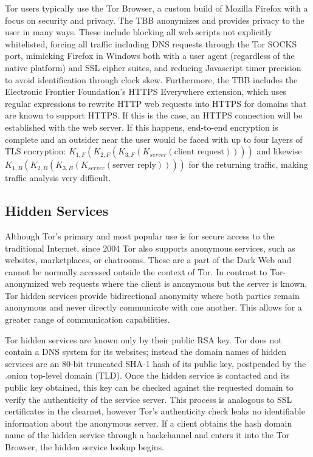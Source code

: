 
Tor users typically use the Tor Browser, a custom build of Mozilla Firefox with a focus on security and privacy. The TBB anonymizes and provides privacy to the user in many ways. These include blocking all web scripts not explicitly whitelisted, forcing all traffic including DNS requests through the Tor SOCKS port, mimicking Firefox in Windows both with a user agent (regardless of the native platform) and SSL cipher suites, and reducing Javascript timer precision to avoid identification through clock skew. Furthermore, the TBB includes the Electronic Frontier Foundation's HTTPS Everywhere extension, which uses regular expressions to rewrite HTTP web requests into HTTPS for domains that are known to support HTTPS. If this is the case, an HTTPS connection will be established with the web server. If this happens, end-to-end encryption is complete and an outsider near the user would be faced with up to four layers of TLS encryption: $K_{1,F}(K_{2,F}(K_{3,F}(K_{server}(\textrm{client\ request}))))$ and likewise $K_{1,B}(K_{2,B}(K_{3,B}(K_{server}(\textrm{server\ reply}))))$ for the returning traffic, making traffic analysis very difficult.

\subsection{Hidden Services}

Although Tor's primary and most popular use is for secure access to the traditional Internet, since 2004 Tor also supports anonymous services, such as websites, marketplaces, or chatrooms. These are a part of the Dark Web and cannot be normally accessed outside the context of Tor. In contrast to Tor-anonymized web requests where the client is anonymous but the server is known, Tor hidden services provide bidirectional anonymity where both parties remain anonymous and never directly communicate with one another. This allows for a greater range of communication capabilities.\cite{NicolussiThesis2011}

Tor hidden services are known only by their public RSA key. Tor does not contain a DNS system for its websites; instead the domain names of hidden services are an 80-bit truncated SHA-1 hash of its public key, postpended by the .onion top-level domain (TLD). Once the hidden service is contacted and its public key obtained, this key can be checked against the requested domain to verify the authenticity of the service server. This process is analogous to SSL certificates in the clearnet, however Tor's authenticity check leaks no identifiable information about the anonymous server. If a client obtains the hash domain name of the hidden service through a backchannel and enters it into the Tor Browser, the hidden service lookup begins.

